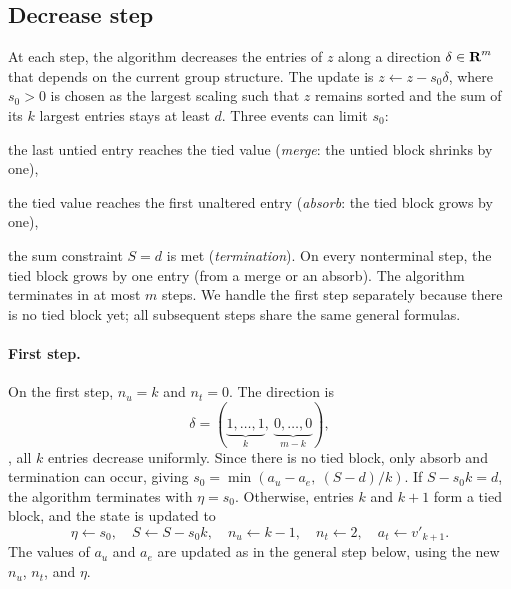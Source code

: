 \documentclass[12pt]{article}
\begin{document}
\subsection{Decrease step}\label{s-decrease}
At each step, the algorithm decreases the entries of $z$ along a direction
$\delta \in {\mbox{\bf R}}^m$ that depends on the current group structure.
The update is $z \leftarrow z - s_0\delta$, where $s_0 > 0$ is chosen
as the largest scaling such that $z$ remains sorted and the sum of its
$k$ largest entries stays at least $d$.
Three events can limit $s_0$:
\BIT
\item the last untied entry reaches the tied value
      (\emph{merge}: the untied block shrinks by one),
\item the tied value reaches the first unaltered entry
      (\emph{absorb}: the tied block grows by one),
\item the sum constraint $S = d$ is met (\emph{termination}).
\EIT
On every nonterminal step, the tied block grows by one entry
(from a merge or an absorb).
The algorithm terminates in at most $m$ steps.
We handle the first step separately because there is no tied block yet;
all subsequent steps share the same general formulas.

\paragraph{First step.}
On the first step, $n_u = k$ and $n_t = 0$.
The direction is
\[
\delta = \left(\underbrace{1, \ldots, 1}_{k},~
\underbrace{0,\ldots,0}_{m-k}\right),
\]
\ie, all $k$ entries decrease uniformly.
Since there is no tied block, only absorb and termination can occur, giving
$s_0 = \min(a_u - a_e,~ (S-d)/k)$.
If $S - s_0 k = d$, the algorithm terminates with $\eta = s_0$.
Otherwise, entries $k$ and $k+1$ form a tied block, and the state
is updated to
\[
\eta \leftarrow s_0, \quad
S \leftarrow S - s_0 k, \quad
n_u \leftarrow k-1, \quad
n_t \leftarrow 2, \quad
a_t \leftarrow v'_{k+1}.
\]
The values of $a_u$ and $a_e$ are updated as in the general step below,
using the new $n_u$, $n_t$, and $\eta$.
\end{document}
